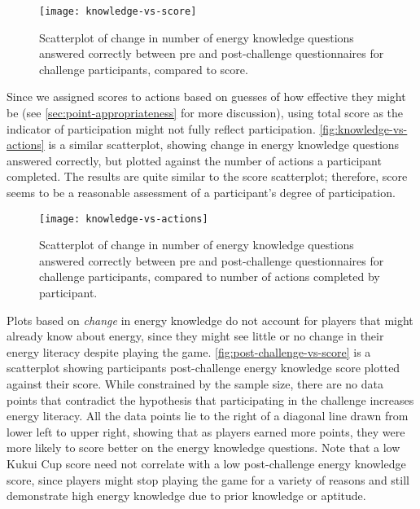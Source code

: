 \begin{figure}[htbp]
	\centering
	\texttt{[image: knowledge-vs-score]}
	\caption[Scatterplot of change in energy knowledge and participant score]{Scatterplot of change in number of energy knowledge questions answered correctly between pre and post-challenge questionnaires for challenge participants, compared to score.}
	\label{fig:knowledge-vs-score}
\end{figure}

Since we assigned scores to actions based on guesses of how effective they might be (see \autoref{sec:point-appropriateness} for more discussion), using total score as the indicator of participation might not fully reflect participation. \autoref{fig:knowledge-vs-actions} is a similar scatterplot, showing change in energy knowledge questions answered correctly, but plotted against the number of actions a participant completed. The results are quite similar to the score scatterplot; therefore, score seems to be a reasonable assessment of a participant's degree of participation.

\begin{figure}[htbp]
	\centering
	\texttt{[image: knowledge-vs-actions]}
	\caption[Scatterplot of change in energy knowledge and actions completed]{Scatterplot of change in number of energy knowledge questions answered correctly between pre and post-challenge questionnaires for challenge participants, compared to number of actions completed by participant.}
	\label{fig:knowledge-vs-actions}
\end{figure}

Plots based on \emph{change} in energy knowledge do not account for players that might already know about energy, since they might see little or no change in their energy literacy despite playing the game. \autoref{fig:post-challenge-vs-score} is a scatterplot showing participants post-challenge energy knowledge score plotted against their score. While constrained by the sample size, there are no data points that contradict the hypothesis that participating in the challenge increases energy literacy. All the data points lie to the right of a diagonal line drawn from lower left to upper right, showing that as players earned more points, they were more likely to score better on the energy knowledge questions. Note that a low Kukui Cup score need not correlate with a low post-challenge energy knowledge score, since players might stop playing the game for a variety of reasons and still demonstrate high energy knowledge due to prior knowledge or aptitude.

